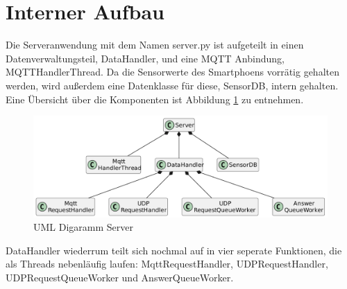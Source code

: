 \documentclass[11pt,a4paper]{report}
\begin{document}
\section{Interner Aufbau}
Die Serveranwendung mit dem Namen server.py ist aufgeteilt in einen Datenverwaltungsteil, DataHandler, und eine MQTT Anbindung, MQTTHandlerThread.
Da die Sensorwerte des Smartphoens vorrätig gehalten werden, wird außerdem eine Datenklasse für diese, SensorDB, intern gehalten.
Eine Übersicht über die Komponenten ist Abbildung \ref{fig:serverUml} zu entnehmen.
\begin{figure}[htbp]
  \centering
  \includegraphics[width=\textwidth]{images/ServerUml}
  \caption{UML Digaramm Server}
  \label{fig:serverUml}
\end{figure}
DataHandler wiederrum teilt sich nochmal auf in vier seperate Funktionen, die als Threads nebenläufig laufen: MqttRequestHandler, UDPRequestHandler, UDPRequestQueueWorker und AnswerQueueWorker.
\end{document}
